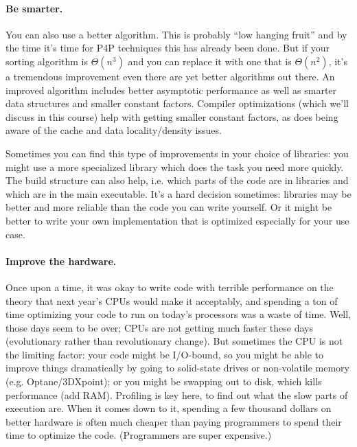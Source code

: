 \documentclass[a4paper]{report}
\begin{document}
\paragraph{Be smarter.} You can also use a better algorithm. This is probably ``low hanging fruit'' and by the time it's time for P4P techniques this has already been done. But if your sorting algorithm is $\Theta(n^{3})$ and you can replace it with one that is $\Theta(n^{2})$, it's a tremendous improvement even there are yet better algorithms out there. An improved algorithm includes better asymptotic performance
as well as smarter data structures and smaller constant factors.
Compiler optimizations (which we'll discuss in this course) help with
getting smaller constant factors, as does being aware of the cache
and data locality/density issues.

Sometimes you can find this type of improvements in your choice of
libraries: you might use a more specialized library which does the
task you need more quickly. The build structure can also help, i.e. which parts of the code are in libraries and which are in the main executable. It's a hard decision sometimes: libraries may be better and more reliable than the code you can write yourself. Or it might be better to write your own implementation that is optimized especially for your use case.

\paragraph{Improve the hardware.} Once upon a time, it was okay to write code with terrible performance on the theory that next year's CPUs would make it acceptably, and spending a ton of time optimizing your code to run on today's processors was a waste of time. Well, those days seem to be over; CPUs are not getting much faster these days (evolutionary rather than revolutionary change). But sometimes the CPU is not the limiting factor: your code might be I/O-bound, so you might be able
to improve things dramatically by going to solid-state drives or non-volatile memory (e.g. Optane/3DXpoint); or you might be swapping
out to disk, which kills performance (add RAM). Profiling is key here, to find out what the slow parts of execution are. When it comes down to it, spending a few thousand dollars on better hardware is often much cheaper than paying programmers to spend their time to optimize the code. (Programmers are super expensive.)
\end{document}
